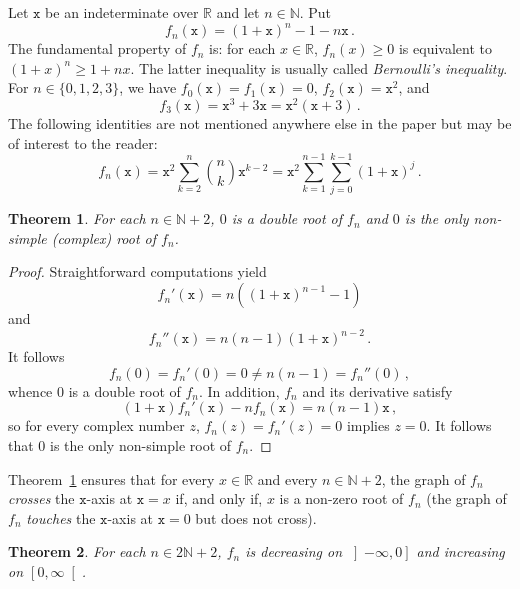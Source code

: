 \documentclass[12pt]{article}
\newcommand{\bR}{\mathbb{R}}
\newcommand{\bN}{\mathbb{N}}
\newcommand{\geint}[1]{\left[ #1, \infty \right[}
\newcommand{\leint}[1]{\left]- \infty, #1 \right]}
\newcommand{\ttx}{\mathtt{x}}
\newtheorem{theorem}{Theorem}
\begin{document}
\sloppy

Let $\ttx$ be an indeterminate over $\bR$ and let $n \in \bN$.
Put
$$
f_n(\ttx) = {(1 + \ttx)}^n - 1 - n \ttx \, .
$$
The fundamental property of $f_n$ is:
for each $x \in \bR$, $f_n(x) \ge 0$ is equivalent to ${(1 + x)}^n \ge 1 + n x$. 
The latter inequality is usually called \emph{Bernoulli's inequality}.
For $n \in \{ 0, 1, 2, 3 \}$, we have 
$f_0(\ttx) = f_1(\ttx) = 0$,
$f_2(\ttx) = \ttx^2$, and
\begin{equation} \label{eq:f3-t3}
f_3(\ttx) = \ttx^3 + 3 \ttx = \ttx^2 (\ttx + 3) \,.
\end{equation}
 The following identities are not mentioned anywhere else in the paper but may be of interest to the reader:
 $$
 f_n (\ttx)
 = \ttx^2 \sum_{k = 2}^n \binom{n}{k} \ttx^{k - 2}
 = \ttx^2 \sum_{k = 1}^{n - 1}  \sum_{j = 0}^{k - 1} {(1 + \ttx)}^j \, .  
 $$

\begin{theorem} \label{thm:root-mult}
  For each $n \in \bN + 2$,
  $0$ is a double root of $f_n$ and $0$ is the only non-simple (complex) root of $f_n$.
\end{theorem}

\begin{proof}
  Straightforward computations yield
  \begin{equation} \label{eq:deriv-fn} 
  f_n'(\ttx)  = n \left( {(1 + \ttx)}^{n - 1} -  1 \right) 
  \end{equation}
  and
  $$
  f_n''(\ttx)  = n (n - 1) {(1 + \ttx)}^{n - 2} \,.
  $$
  It follows
  $$
  f_n(0) = f_n'(0) = 0 \ne n (n - 1) = f_n''(0) \, ,
  $$
  whence $0$ is a double root of $f_n$.
  In addition, $f_n$ and its derivative satisfy 
   $$
   (1 + \ttx) f_n'(\ttx) - n f_n(\ttx) = n (n - 1) \ttx \, ,
   $$
   so for every complex number $z$, $f_n(z) = f_n'(z) = 0$ implies $z = 0$.
   It follows that $0$ is the only non-simple root of $f_n$.
 \end{proof}
 
Theorem~\ref{thm:root-mult} ensures that for every $x \in \bR$ and every $n \in \bN + 2$,
the graph of $f_n$ \emph{crosses} the $\ttx$-axis at $\ttx = x$ if, and only if, $x$ is a non-zero root of $f_n$
(the graph of $f_n$ \emph{touches} the $\ttx$-axis at $\ttx = 0$ but does not cross).



 \begin{theorem} \label{thm:variation-even}
   For each $n \in 2 \bN + 2$,
   $f_n$ is
   decreasing on $\leint{0}$ and
   increasing on $\geint{0}$.
 \end{theorem}
\end{document}
